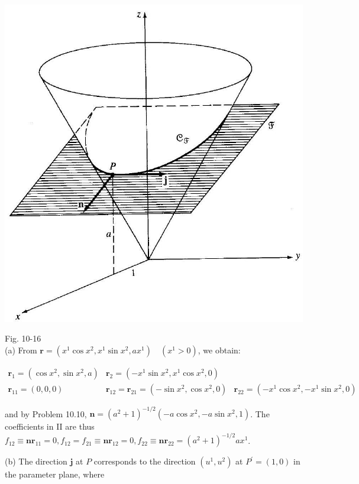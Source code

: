 \documentclass[10pt]{article}
\begin{document}
\begin{center}
\includegraphics[max width=\textwidth]{2024_04_03_41f90be4f896e21f0dc9g-157(1)}
\end{center}

Fig. 10-16\\
(a) From $\mathbf{r}=\left(x^{1} \cos x^{2}, x^{1} \sin x^{2}, a x^{1}\right) \quad\left(x^{1}>0\right)$, we obtain:

$$
\begin{array}{ccc}
\mathbf{r}_{1}=\left(\cos x^{2}, \sin x^{2}, a\right) & \mathbf{r}_{2}=\left(-x^{1} \sin x^{2}, x^{1} \cos x^{2}, 0\right) \\
\mathbf{r}_{11}=(0,0,0) & \mathbf{r}_{12}=\mathbf{r}_{21}=\left(-\sin x^{2}, \cos x^{2}, 0\right) & \mathbf{r}_{22}=\left(-x^{1} \cos x^{2},-x^{1} \sin x^{2}, 0\right)
\end{array}
$$

and by Problem 10.10, $\mathbf{n}=\left(a^{2}+1\right)^{-1 / 2}\left(-a \cos x^{2},-a \sin x^{2}, 1\right)$. The coefficients in II are thus $f_{12} \equiv \mathbf{n r}_{11}=0, f_{12}=f_{21} \equiv \mathbf{n} \mathbf{r}_{12}=0, f_{22} \equiv \mathbf{n r}_{22}=\left(a^{2}+1\right)^{-1 / 2} a x^{1}$.

(b) The direction $\mathbf{j}$ at $P$ corresponds to the direction $\left(u^{1}, u^{2}\right)$ at $P^{\prime}=(1,0)$ in the parameter plane, where
\end{document}
